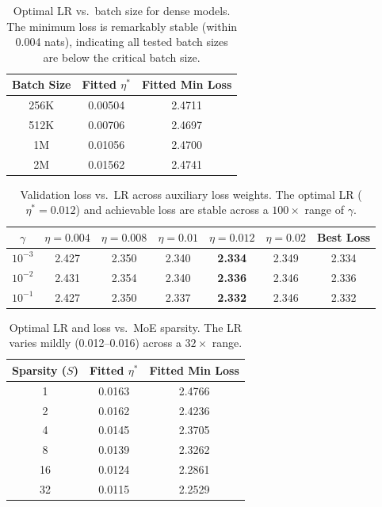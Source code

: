 \documentclass{article}
\begin{document}
\begin{table}[H]
\centering
\caption{Optimal LR vs.\ batch size for dense models. The minimum loss is remarkably stable (within 0.004 nats), indicating all tested batch sizes are below the critical batch size.}
\label{tab:bsz-scaling}
\vspace{0.1cm}
\begin{tabular}{ccc}
\toprule
\textbf{Batch Size} & \textbf{Fitted $\eta^*$} & \textbf{Fitted Min Loss} \\
\midrule
256K & 0.00504 & 2.4711 \\
512K & 0.00706 & 2.4697 \\
1M   & 0.01056 & 2.4700 \\
2M   & 0.01562 & 2.4741 \\
\bottomrule
\end{tabular}
\end{table}

\begin{table}[H]
\centering
\caption{Validation loss vs.\ LR across auxiliary loss weights. The optimal LR ($\eta^* = 0.012$) and achievable loss are stable across a $100\times$ range of $\gamma$.}
\label{tab:auxloss}
\vspace{0.1cm}
\begin{tabular}{ccccccc}
\toprule
$\gamma$ & $\eta{=}0.004$ & $\eta{=}0.008$ & $\eta{=}0.01$ & $\eta{=}0.012$ & $\eta{=}0.02$ & \textbf{Best Loss} \\
\midrule
$10^{-3}$ & 2.427 & 2.350 & 2.340 & \textbf{2.334} & 2.349 & 2.334 \\
$10^{-2}$ & 2.431 & 2.354 & 2.340 & \textbf{2.336} & 2.346 & 2.336 \\
$10^{-1}$ & 2.427 & 2.350 & 2.337 & \textbf{2.332} & 2.346 & 2.332 \\
\bottomrule
\end{tabular}
\end{table}

\begin{table}[H]
\centering
\caption{Optimal LR and loss vs.\ MoE sparsity. The LR varies mildly (0.012--0.016) across a $32\times$ range.}
\label{tab:sparsity}
\vspace{0.1cm}
\begin{tabular}{ccc}
\toprule
\textbf{Sparsity ($S$)} & \textbf{Fitted $\eta^*$} & \textbf{Fitted Min Loss} \\
\midrule
1  & 0.0163 & 2.4766 \\
2  & 0.0162 & 2.4236 \\
4  & 0.0145 & 2.3705 \\
8  & 0.0139 & 2.3262 \\
16 & 0.0124 & 2.2861 \\
32 & 0.0115 & 2.2529 \\
\bottomrule
\end{tabular}
\end{table}
\end{document}
